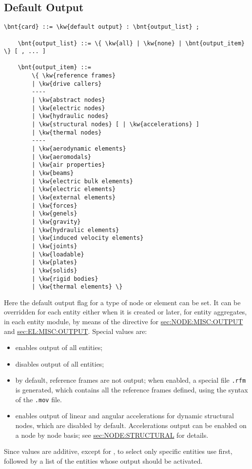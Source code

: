 \subsection{Default Output}\label{sec:CONTROLDATA:DEFAULTOUTPUT}
\begin{Verbatim}[commandchars=\\\{\}]
    \bnt{card} ::= \kw{default output} : \bnt{output_list} ;

    \bnt{output_list} ::= \{ \kw{all} | \kw{none} | \bnt{output_item} \} [ , ... ]

    \bnt{output_item} ::=
        \{ \kw{reference frames}
        | \kw{drive callers}
        ----
        | \kw{abstract nodes}
        | \kw{electric nodes}
        | \kw{hydraulic nodes}
        | \kw{structural nodes} [ | \kw{accelerations} ]
        | \kw{thermal nodes}
        ----
        | \kw{aerodynamic elements}
        | \kw{aeromodals}
        | \kw{air properties}
        | \kw{beams}
        | \kw{electric bulk elements}
        | \kw{electric elements}
        | \kw{external elements}
        | \kw{forces}
        | \kw{genels}
        | \kw{gravity}
        | \kw{hydraulic elements}
        | \kw{induced velocity elements}
        | \kw{joints}
        | \kw{loadable}
        | \kw{plates}
        | \kw{solids}
        | \kw{rigid bodies}
        | \kw{thermal elements} \}
\end{Verbatim}
Here the default output flag for a type of node or element can be set.
It can be overridden for each entity either when it is created or later,
for entity aggregates, in each entity module, by means of the 
directive for 
\hyperref{\kw{nodes}}{\kw{nodes} (see Section~}{)}{sec:NODE:MISC:OUTPUT}
and 
\hyperref{\kw{elements}}{\kw{elements} (see Section~}{)}{sec:EL:MISC:OUTPUT}.
Special values are:
\begin{itemize}
\item {} enables output of all entities;
\item {} disables output of all entities;
\item {} by default, reference frames are not output;
when enabled, a special file \texttt{.rfm} is generated, which contains
all the reference frames defined, using the syntax of the \texttt{.mov} file.
\item {} enables output of linear and angular accelerations
for dynamic structural nodes, which are disabled by default.
Accelerations output can be enabled on a node by node basis;
see 
\hyperref{\kw{structural node}}{\kw{structural node} (see Section~}{)}{sec:NODE:STRUCTURAL}
for details.
\end{itemize}
Since values are additive, except for , to select 
only specific entities use  first, followed by a list
of the entities whose output should be activated.

